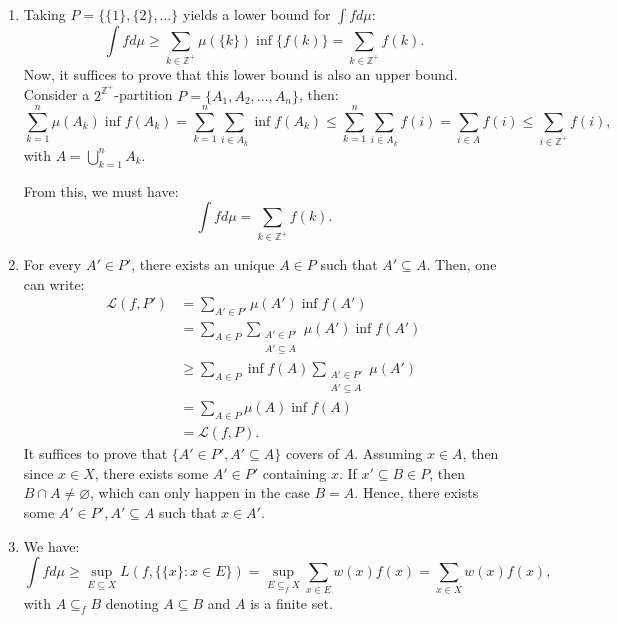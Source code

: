 \begin{enumerate}[label=\textbf{3A.\arabic*}]
  \item Taking \( P = \{\{1\}, \{2\} , \ldots    \}   \) yields a lower bound
    for \( \int f d \mu  \):
    \[
      \int f d\mu \ge \sum_{k \in \mathbb{Z}^{+}} \mu(\{k\}  ) \inf \{f(k)\}   =
      \sum_{k \in \mathbb{Z}^{+}} f(k)
    .\] 
    Now, it suffices to prove that this lower bound is also an upper bound.
    Consider a \( 2^{\mathbb{Z}^{+}} \)-partition \( P = \{A_{1}, A_{2}, \ldots ,
    A_{n}\}   \), then:
    \[
      \sum_{k  = 1}^{n} \mu (A_{k}) \inf f(A_{k}) = \sum_{k = 1}^{n} \sum_{i \in
      A_{k}} \inf f(A_{k}) \le \sum_{k = 1}^{n} \sum_{i \in A_{k}} f(i) =
      \sum_{i \in A} f(i) \le \sum_{i \in \mathbb{Z}^{+}} f(i)
    ,\] with \( A = \bigcup_{k = 1}^{n} A_{k} \).

    From this, we must have:
    \[
      \int f d\mu  = \sum_{k \in \mathbb{Z}^{+}} f(k)
    .\] 
  \item For every \( A' \in P' \), there exists an unique \( A \in P \) such that
    \( A' \subseteq A \). Then, one can write:
    \begin{align*}
      \mathcal{L}(f, P') &= \sum_{A' \in P'} \mu (A') \inf f(A')  \\
                         &= \sum_{A \in P}
      \sum_{\substack{A' \in P'\\A' \subseteq A}} \mu (A') \inf f(A')\\
                         &\ge \sum_{A \in P} \inf f(A)\sum_{\substack{A' \in
                         P'\\A'\subseteq A}} \mu (A')\\
                         &= \sum_{A \in P} \mu (A) \inf f(A)\\
                         &= \mathcal{L}(f, P)
    .\end{align*}
    It suffices to prove that \( \{A' \in P', A' \subseteq A\}   \)
    covers of \( A \). Assuming \( x \in A \), then since \( x \in X \), there
    exists some \( A' \in P' \) containing \( x \). If \( x' \subseteq B \in P
    \), then \( B \cap A \neq \varnothing \), which can only happen in the case
    \( B = A \). Hence, there exists some \( A' \in P', A' \subseteq A \) such
    that \( x \in A' \).
  \item We have:
    \[
      \int f d\mu \ge \sup_{E \subseteq X}  L(f, \{\{x\} : x \in E \}  ) = \sup
      _{E \subseteq_{f} X} \sum_{x \in E} w(x)f(x) = \sum_{x \in X} w(x)f(x)
    ,\] with \( A \subseteq_{f} B \) denoting \( A \subseteq B \) and \( A \) is
    a finite set.


\end{enumerate}
